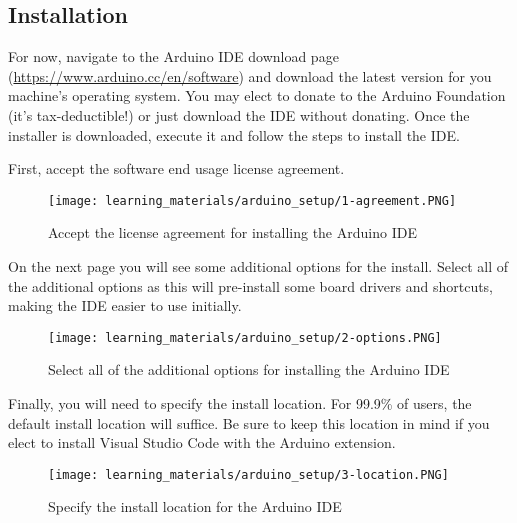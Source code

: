     \subsection*{Installation}
    For now, navigate to the Arduino IDE download page (\url{https://www.arduino.cc/en/software}) and download the latest version for you machine's operating system.
    You may elect to donate to the Arduino Foundation (it's tax-deductible!) or just download the IDE without donating.
    Once the installer is downloaded, execute it and follow the steps to install the IDE.

    First, accept the software end usage license agreement.

    \begin{figure}[h!]
        \texttt{[image: learning\_materials/arduino\_setup/1-agreement.PNG]}
        \caption[Arduino License]{Accept the license agreement for installing the Arduino IDE}
    \end{figure}

    On the next page you will see some additional options for the install.
    Select all of the additional options as this will pre-install some board drivers and shortcuts, making the IDE easier to use initially.

    \begin{figure}[h!]
        \texttt{[image: learning\_materials/arduino\_setup/2-options.PNG]}
        \caption[Arduino Install Options]{Select all of the additional options for installing the Arduino IDE}
    \end{figure}

    Finally, you will need to specify the install location.
    For 99.9\% of users, the default install location will suffice.
    Be sure to keep this location in mind if you elect to install Visual Studio Code with the Arduino extension.

    \begin{figure}[h!]
        \texttt{[image: learning\_materials/arduino\_setup/3-location.PNG]}
        \caption[Arduino Location]{Specify the install location for the Arduino IDE}
    \end{figure}

